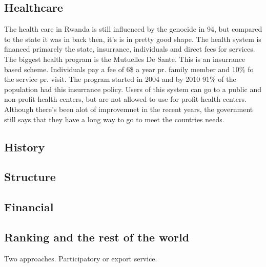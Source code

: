 \begin{description}
\section{Healthcare}
The health care in Rwanda is still influenced by the genocide in 94, but compared to the state it was in back then, it's is in pretty good shape.
The health system is financed primarely the state, insurrance, individuals and direct fees for services.
The biggest health program is the Mutuelles De Sante. This is an insurrance based scheme.
Individuals pay a fee of 6\$ a year pr. family member and 10\% fo the service pr. visit.
The program started in 2004 and by 2010 91\% of the population had this insurrance policy.
Users of this system can go to a public and non-profit health centers, but are not allowed to use for profit health centers.
Although there's been alot of improvemnet in the recent years, the government still says that they have a long way to go to meet the countries needs.
\cite{20}
\subsection{History}
\subsection{Structure}
\subsection{Financial}
\subsection{Ranking and the rest of the world}
Two approaches. Participatory or export service.

\end{description}
